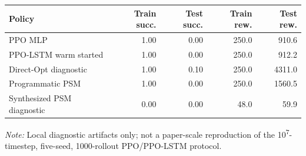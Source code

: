 \begin{tabular}{lrrrr}
\toprule
Policy & Train succ. & Test succ. & Train rew. & Test rew. \\
\midrule
PPO MLP & 1.00 & 0.00 & 250.0 & 910.6 \\
PPO-LSTM warm started & 1.00 & 0.00 & 250.0 & 912.2 \\
Direct-Opt diagnostic & 1.00 & 0.10 & 250.0 & 4311.0 \\
Programmatic PSM & 1.00 & 0.00 & 250.0 & 1560.5 \\
Synthesized PSM diagnostic & 0.00 & 0.00 & 48.0 & 59.9 \\
\bottomrule
\end{tabular}
\par\smallskip\noindent\emph{Note:} Local diagnostic artifacts only; not a paper-scale reproduction of the 10\textsuperscript{7}-timestep, five-seed, 1000-rollout PPO/PPO-LSTM protocol.
